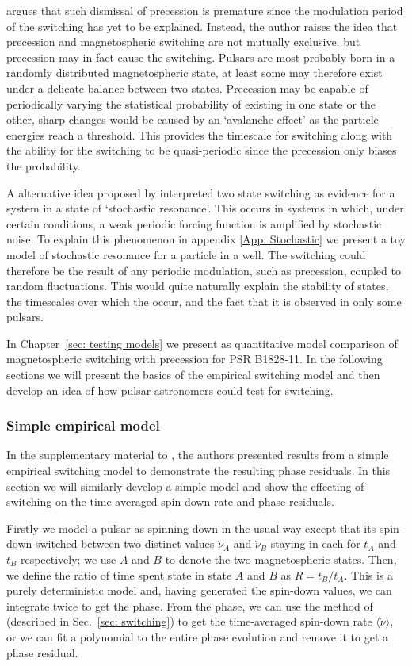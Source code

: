 \citet{Jones2012} argues that such dismissal of precession is premature since
the modulation period of the switching has yet to be explained.  Instead, the
author raises the idea that precession and magnetospheric switching are not
mutually exclusive, but precession may in fact cause the switching. Pulsars are
most probably born in a randomly distributed magnetospheric state, at least
some may therefore exist under a delicate balance between two states.
Precession may be capable of periodically varying the statistical probability
of existing in one state or the other, sharp changes would be caused by an
`avalanche effect' as the particle energies reach a threshold.  This provides
the timescale for switching along with the ability for the switching to be
quasi-periodic since the precession only biases the probability.

A alternative idea proposed by \citet{Cordes2013} interpreted two state
switching as evidence for a system in a state of `stochastic resonance'.  This
occurs in systems in which, under certain conditions, a weak periodic forcing
function is amplified by stochastic noise. To explain this phenomenon in
appendix \ref{App: Stochastic} we present a toy model of stochastic resonance
for a particle in a well. The switching could therefore be the result of any
periodic modulation, such as precession, coupled to random fluctuations. This
would quite naturally explain the stability of states, the timescales over
which the occur, and the fact that it is observed in only some pulsars.

In Chapter~\ref{sec: testing models} we present as quantitative
model comparison of magnetospheric switching with precession for PSR B1828-11.
In the following sections we will present the basics of the empirical switching
model and then develop an idea of how pulsar astronomers could test for switching.

\subsubsection{Simple empirical model}

In the supplementary material to \citet{Lyne2010}, the authors presented
results from a simple empirical switching model to demonstrate the resulting
phase residuals. In this section we will similarly develop a simple model and
show the effecting of switching on the time-averaged spin-down rate and phase
residuals.

Firstly we model a pulsar as spinning down in the usual way except that its
spin-down switched between two distinct values $\dot{\nu}_{A}$ and $\dot{\nu}_{B}$
staying in each for $t_A$ and $t_B$ respectively; we use
$A$ and $B$ to denote the two magnetospheric states. Then, we
define the ratio of time spent state in state $A$ and $B$ as $R =
t_{B}/t_{A}$.  This is a purely deterministic model and, having generated the
spin-down values, we can integrate twice to get the phase. From the phase, we can
use the method of \citet{Lyne2010} (described in Sec.~\ref{sec: switching})
to get the time-averaged spin-down rate $\langle\dot{\nu}\rangle$, or we can
fit a polynomial to the entire phase evolution and remove it to get a phase
residual.

